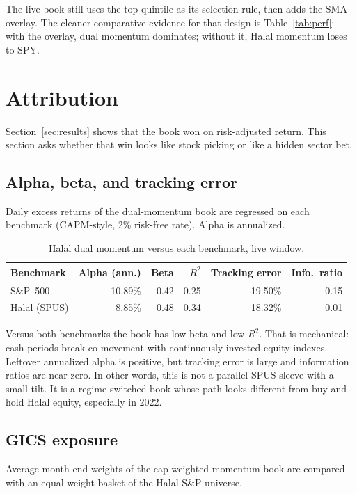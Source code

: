 \documentclass[11pt,letterpaper]{article}
\begin{document}
The live book still uses the top quintile as its selection rule, then adds the SMA overlay. The cleaner comparative evidence for that design is Table~\ref{tab:perf}: with the overlay, dual momentum dominates; without it, Halal momentum loses to SPY.

\section{Attribution}
\label{sec:attrib}

Section~\ref{sec:results} shows that the book won on risk-adjusted return. This section asks whether that win looks like stock picking or like a hidden sector bet.

\subsection{Alpha, beta, and tracking error}

Daily excess returns of the dual-momentum book are regressed on each benchmark (CAPM-style, 2\% risk-free rate). Alpha is annualized.

\begin{table}[htbp]
\centering
\caption{Halal dual momentum versus each benchmark, live window.}
\label{tab:capm}
\begin{tabular}{lrrrrr}
\toprule
Benchmark & Alpha (ann.) & Beta & $R^2$ & Tracking error & Info.\ ratio \\
\midrule
S\&P~500     & 10.89\% & 0.42 & 0.25 & 19.50\% & 0.15 \\
Halal (SPUS) & 8.85\%  & 0.48 & 0.34 & 18.32\% & 0.01 \\
\bottomrule
\end{tabular}
\end{table}

Versus both benchmarks the book has low beta and low $R^2$. That is mechanical: cash periods break co-movement with continuously invested equity indexes. Leftover annualized alpha is positive, but tracking error is large and information ratios are near zero. In other words, this is not a parallel SPUS sleeve with a small tilt. It is a regime-switched book whose path looks different from buy-and-hold Halal equity, especially in 2022.

\subsection{GICS exposure}

Average month-end weights of the cap-weighted momentum book are compared with an equal-weight basket of the Halal S\&P universe.
\end{document}
